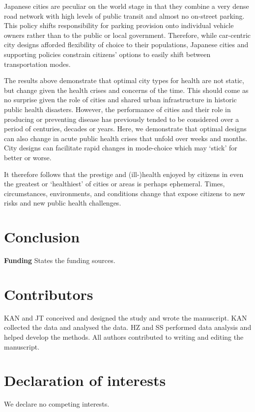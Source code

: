 \documentclass[preprint,12pt]{elsarticle}
\begin{document}
Japanese cities are peculiar on the world stage in that they combine a very dense road network with high levels of public transit and almost no on-street parking. This policy shifts responsibility for parking provision onto individual vehicle owners rather than to the public or local government. Therefore, while car-centric city designs afforded flexibility of choice to their populations, Japanese cities and supporting policies constrain citizens' options to easily shift between transportation modes.

The results above demonstrate that optimal city types for health are not static, but change given the health crises and concerns of the time. This should come as no surprise given the role of cities and shared urban infrastructure in historic public health disasters. However, the performance of cities and their role in producing or preventing disease has previously tended to be considered over a period of centuries, decades or years. Here, we demonstrate that optimal designs can also change in acute public health crises that unfold over weeks and months. City designs can facilitate rapid changes in mode-choice which may `stick' for better or worse. 

It therefore follows that the prestige and (ill-)health enjoyed by citizens in even the greatest or `healthiest' of cities or areas is perhaps ephemeral. Times, circumstances, environments, and conditions change that expose citizens to new risks and new public health challenges.


\section*{Conclusion}

\textbf{Funding} States the funding sources.

\section*{Contributors}\label{sec:credit}
KAN and JT conceived and designed the study and wrote the manuscript. KAN collected the data and analysed the data. HZ and SS performed data analysis and helped develop the methods. All authors contributed to writing and editing the manuscript.

\section*{Declaration of interests}\label{sec:dec}
We declare no competing interests.
\end{document}
